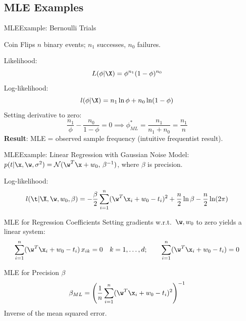 \subsection{MLE Examples}

\begin{frame}{MLE}{Example: Bernoulli Trials}
  \begin{exampleblock}{Coin Flips}
    $n$ binary events; $n_1$ successes, $n_0$ failures.

    Likelihood:
    \[
      L(\phi|\X) = \phi^{n_1}(1-\phi)^{n_0}
    \]
    Log-likelihood:
    \[
      l(\phi|\X) = n_1 \ln\phi + n_0\ln(1-\phi)
    \]
    Setting derivative to zero:
    \[
      \frac{n_1}{\phi} - \frac{n_0}{1-\phi} = 0 \implies \phi^*_{ML} = \frac{n_1}{n_1+n_0} = \frac{n_1}{n}
    \]
    \textbf{Result}: MLE = observed sample frequency (intuitive frequentist result).
  \end{exampleblock}
\end{frame}

\begin{frame}{MLE}{Example: Linear Regression with Gaussian Noise}
  Model: $p(t|\x,\w,\sigma^2) = \mathcal{N}(\w^T\x + w_0,\,\beta^{-1})$, where $\beta$ is precision.

  Log-likelihood:
  \[
    l(\t|\X,\w,w_0,\beta) = -\frac{\beta}{2}\sum_{i=1}^n(\w^T\x_i+w_0-t_i)^2 + \frac{n}{2}\ln\beta - \frac{n}{2}\ln(2\pi)
  \]

  \begin{block}{MLE for Regression Coefficients}
    Setting gradients w.r.t.\ $\w, w_0$ to zero yields a linear system:
    \[
      \sum_{i=1}^n(\w^T\x_i+w_0-t_i)\,x_{ik} = 0 \quad k=1,\ldots,d; \qquad \sum_{i=1}^n(\w^T\x_i+w_0-t_i) = 0
    \]
  \end{block}
  \begin{block}{MLE for Precision $\beta$}
    \[
      \beta_{ML} = \left(\frac{1}{n}\sum_{i=1}^n(\w^T\x_i+w_0-t_i)^2\right)^{-1}
    \]
    Inverse of the mean squared error.
  \end{block}
\end{frame}

